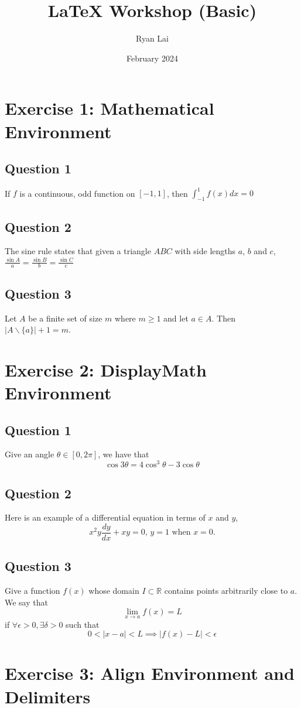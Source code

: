 \documentclass[12pt]{article}
\title{LaTeX Workshop (Basic)}
\author{Ryan Lai}
\date{February 2024}
\begin{document}
\maketitle
\tableofcontents
\section{Exercise 1: Mathematical Environment}
\subsection{Question 1}
If $f$ is a continuous, odd function on $[-1, 1]$, then $\int_{-1}^1f(x)dx=0$
\subsection{Question 2}
The sine rule states that given a triangle $ABC$ with side lengths $a$, $b$ and $c$, $\frac{\sin A}{a}=\frac{\sin B}{b}=\frac{\sin C}{c}$
\subsection{Question 3}
Let $A$ be a finite set of size $m$ where $m\geq{1}$ and let $a\in{A}$. Then $|A \backslash \{ a \}|+1=m$.
\section{Exercise 2: DisplayMath Environment}
\subsection{Question 1}
Give an angle $\theta \in [0, 2\pi]$, we have that $$\cos 3\theta =4\cos^3 \theta-3\cos \theta$$
\subsection{Question 2}
Here is an example of a differential equation in terms of $x$ and $y$, $$x^2y\frac{dy}{dx}+xy=0\text{, } y=1 \text{ when } x=0.$$
\subsection{Question 3}
Give a function $f(x)$ whose domain $I \subset\mathbb{R} $ contains points arbitrarily close to $a$. We say that $$\lim_{x\to a}f(x)=L$$ if $\forall \epsilon >0, \exists \delta >0$ such that \[0<|x-a|<L\implies |f(x)-L|<\epsilon\]
\section{Exercise 3: Align Environment and Delimiters}
\end{document}
